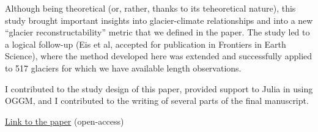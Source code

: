 Although being theoretical (or, rather, thanks to its teheoretical nature),
this study brought important insights into
glacier-climate relationships and into a new “glacier reconstructability” metric that
we defined in the paper. The study led to a logical follow-up (Eis et al, accepted
for publication in Frontiers in Earth Science), where the method developed here
was extended and successfully applied to 517 glaciers for which we have available length
observations.

I contributed to the study design of this paper, provided support to Julia in using
OGGM, and I contributed to the writing of several parts of the final manuscript.

\href{https://doi.org/10.5194/tc-13-3317-2019}{Link to the paper} (open-access)


%

